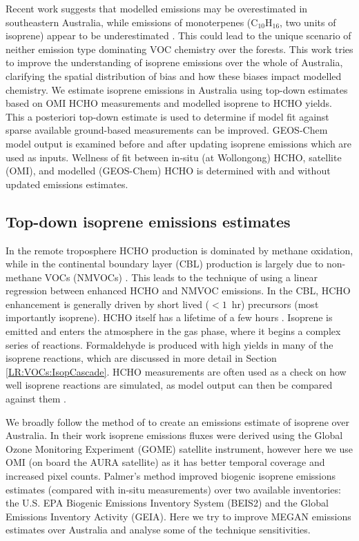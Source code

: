     Recent work suggests that modelled emissions may be overestimated in southeastern Australia, while emissions of monoterpenes (C$_{10}$H$_{16}$, two units of isoprene) appear to be underestimated \parencite{Emmerson2016}. 
    This could lead to the unique scenario of neither emission type dominating VOC chemistry over the forests.
    This work tries to improve the understanding of isoprene emissions over the whole of Australia, clarifying the spatial distribution of bias and how these biases impact modelled chemistry.
    We estimate isoprene emissions in Australia using top-down estimates based on OMI HCHO measurements and modelled isoprene to HCHO yields.
    This a posteriori top-down estimate is used to determine if model fit against sparse available ground-based measurements can be improved.
    GEOS-Chem model output is examined before and after updating isoprene emissions which are used as inputs.
    Wellness of fit between in-situ (at Wollongong) HCHO, satellite (OMI), and modelled (GEOS-Chem) HCHO is determined with and without updated emissions estimates.
    
  \subsection{Top-down isoprene emissions estimates}
    
    In the remote troposphere HCHO production is dominated by methane oxidation, while in the continental boundary layer (CBL) production is largely due to non-methane VOCs (NMVOCs) \parencite{Abbot2003, Kefauver2014}.
    This leads to the technique of using a linear regression between enhanced HCHO and NMVOC emissions.
    In the CBL, HCHO enhancement is generally driven by short lived ($<1$~hr) precursors (most importantly isoprene).
    HCHO itself has a lifetime of a few hours \parencite{Kefauver2014}.
    Isoprene is emitted and enters the atmosphere in the gas phase, where it begins a complex series of reactions.
    Formaldehyde is produced with high yields in many of the isoprene reactions, which are discussed in more detail in Section \ref{LR:VOCs:IsopCascade}.
    HCHO measurements are often used as a check on how well isoprene reactions are simulated, as model output can then be compared against them \parencite{Marvin2017}.
    
    We broadly follow the method of \textcite{Palmer2001} to create an emissions estimate of isoprene over Australia.
    In their work isoprene emissions fluxes were derived using the Global Ozone Monitoring Experiment (GOME) satellite instrument, however here we use OMI (on board the AURA satellite) as it has better temporal coverage and increased pixel counts.
    Palmer's method improved biogenic isoprene emissions estimates (compared with in-situ measurements) over two available inventories: the U.S. EPA Biogenic Emissions Inventory System (BEIS2) and the Global Emissions Inventory Activity (GEIA).
    Here we try to improve MEGAN emissions estimates over Australia and analyse some of the technique sensitivities.
    
